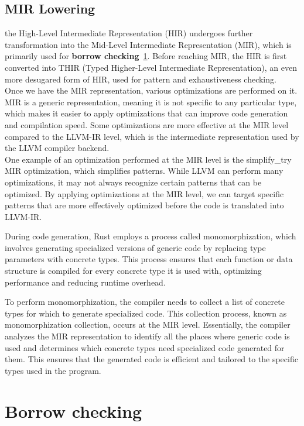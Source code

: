 \documentclass{article}
\begin{document}
\subsection{MIR Lowering}
the High-Level Intermediate Representation (HIR) undergoes further transformation into the Mid-Level Intermediate Representation (MIR), which is primarily used for \textbf{borrow checking}~\ref{sec:borrow}. Before reaching MIR, the HIR is first converted into THIR (Typed Higher-Level Intermediate Representation), an even more desugared form of HIR, used for pattern and exhaustiveness checking.\\
Once we have the MIR representation, various optimizations are performed on it. MIR is a generic representation, meaning it is not specific to any particular type, which makes it easier to apply optimizations that can improve code generation and compilation speed. Some optimizations are more effective at the MIR level compared to the LLVM-IR level, which is the intermediate representation used by the LLVM compiler backend.\\
One example of an optimization performed at the MIR level is the simplify\_try MIR optimization, which simplifies patterns. While LLVM can perform many optimizations, it may not always recognize certain patterns that can be optimized. By applying optimizations at the MIR level, we can target specific patterns that are more effectively optimized before the code is translated into LLVM-IR.

During code generation, Rust employs a process called monomorphization, which involves generating specialized versions of generic code by replacing type parameters with concrete types. This process ensures that each function or data structure is compiled for every concrete type it is used with, optimizing performance and reducing runtime overhead.

To perform monomorphization, the compiler needs to collect a list of concrete types for which to generate specialized code. This collection process, known as monomorphization collection, occurs at the MIR level. Essentially, the compiler analyzes the MIR representation to identify all the places where generic code is used and determines which concrete types need specialized code generated for them. This ensures that the generated code is efficient and tailored to the specific types used in the program.





\section{Borrow checking}
\label{sec:borrow}
\end{document}
